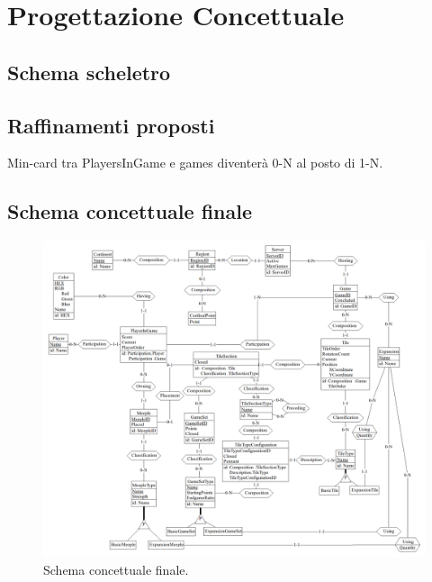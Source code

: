 \section{Progettazione Concettuale}
\subsection{Schema scheletro}

\subsection{Raffinamenti proposti}
Min-card tra PlayersInGame e games diventerà 0-N al posto di 1-N.

\subsection{Schema concettuale finale}
\begin{figure}[hb]
    \centering\includegraphics[scale=0.24]{images/Progettazione/Concettuale/modello.png}
    \caption{Schema concettuale finale.}
\end{figure}